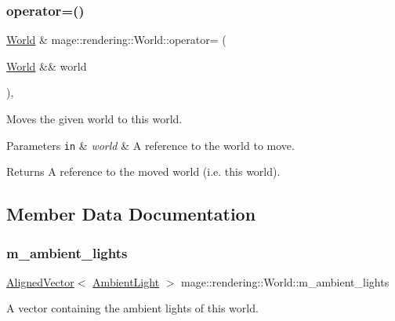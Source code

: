 \subsubsection{\texorpdfstring{operator=()}{operator=()}\hspace{0.1cm}{\footnotesize\ttfamily [2/2]}}
{\footnotesize\ttfamily \mbox{\hyperlink{classmage_1_1rendering_1_1_world}{World}} \& mage\+::rendering\+::\+World\+::operator= (\begin{DoxyParamCaption}\item[{\mbox{\hyperlink{classmage_1_1rendering_1_1_world}{World}} \&\&}]{world }\end{DoxyParamCaption})\hspace{0.3cm}{\ttfamily [default]}, {\ttfamily [noexcept]}}

Moves the given world to this world.


\begin{DoxyParams}[1]{Parameters}
\mbox{\tt in}  & {\em world} & A reference to the world to move. \\
\hline
\end{DoxyParams}
\begin{DoxyReturn}{Returns}
A reference to the moved world (i.\+e. this world). 
\end{DoxyReturn}


\subsection{Member Data Documentation}
\mbox{\label{classmage_1_1rendering_1_1_world_a0c63647dbf30b3df91e6cfbb483847c9}} 
\subsubsection{\texorpdfstring{m\+\_\+ambient\+\_\+lights}{m\_ambient\_lights}}
{\footnotesize\ttfamily \mbox{\hyperlink{namespacemage_a8664bfb5ce2179fc64eae9f82c8a5ba8}{Aligned\+Vector}}$<$ \mbox{\hyperlink{classmage_1_1rendering_1_1_ambient_light}{Ambient\+Light}} $>$ mage\+::rendering\+::\+World\+::m\+\_\+ambient\+\_\+lights\hspace{0.3cm}{\ttfamily [private]}}

A vector containing the ambient lights of this world. \mbox{\label{classmage_1_1rendering_1_1_world_a58ea474801fba5e39ff4f8a7d4c0a842}} 
